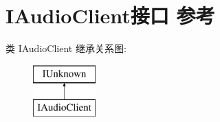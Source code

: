 \hypertarget{interface_i_audio_client}{}\section{I\+Audio\+Client接口 参考}
\label{interface_i_audio_client}
类 I\+Audio\+Client 继承关系图\+:\begin{figure}[H]
\begin{center}
\leavevmode
\includegraphics[height=2.000000cm]{interface_i_audio_client}
\end{center}
\end{figure}
